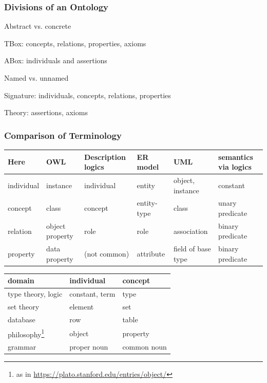 \begin{frame}\frametitle{Divisions of an Ontology}
\begin{blockitems}{Abstract vs. concrete}
 \item TBox: concepts, relations, properties, axioms
 \item ABox: individuals and assertions
\end{blockitems}

\begin{blockitems}{Named vs. unnamed}
 \item Signature: individuals, concepts, relations, properties 
 \item Theory: assertions, axioms
\end{blockitems}
\end{frame}

\begin{frame}\frametitle{Comparison of Terminology}
\begin{center}
\tiny
\begin{tabular}{l|llll|l}
 Here       & OWL      & Description logics & ER model & UML & semantics via logics\\
\hline
 individual & instance & individual & entity & object, instance & constant\\
 concept    & class    & concept &  entity-type & class & unary predicate\\
 relation   & object property & role & role & association & binary predicate \\
 property   & data property   & (not common) & attribute & field of base type & binary predicate\\
\end{tabular}
\medskip

\begin{tabular}{l|ll}
 domain & individual & concept \\
\hline
type theory, logic & constant, term & type \\
set theory  & element & set \\
database    & row & table \\
philosophy\footnote{as in \url{https://plato.stanford.edu/entries/object/}} & object & property \\
grammar & proper noun & common noun \\
\end{tabular}
\end{center}
\end{frame}

